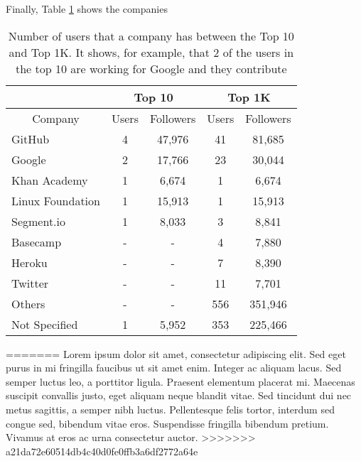 Finally, Table \ref{tbl:topcompanies} shows the companies 
\begin{table}
\centering
\begin{tabular}{ | l | c | c | c | c | }
	\hline
	\- & \multicolumn{2}{|c|}{Top 10} & \multicolumn{2}{|c|}{Top 1K} \\ \hline
	\multicolumn{1}{|c|}{Company} & Users & Followers & Users & Followers \\ \hline
	GitHub & 4 & 47,976 & 41 & 81,685 \\ \hline
	Google & 2 & 17,766 & 23 & 30,044 \\ \hline
	Khan Academy & 1 & 6,674 & 1 & 6,674 \\ \hline
	Linux Foundation & 1 & 15,913 & 1 & 15,913 \\ \hline
	Segment.io & 1 & 8,033 & 3 & 8,841 \\ \hline
	Basecamp & - & - & 4 & 7,880 \\ \hline
	Heroku & - & - & 7 & 8,390 \\ \hline
	Twitter & - & - & 11 & 7,701 \\ \hline
	Others & - & - & 556 & 351,946 \\ \hline
	Not Specified & 1 & 5,952 & 353 & 225,466 \\ \hline
\end{tabular}
\caption{Number of users that a company has between the Top 10 and Top 1K. It shows, for example, that 2 of the users in the top 10 are working for Google and they contribute }
\label{tbl:topcompanies}
\end{table}
=======
Lorem ipsum dolor sit amet, consectetur adipiscing elit. Sed eget purus in mi fringilla faucibus ut sit amet enim. Integer ac aliquam lacus. Sed semper luctus leo, a porttitor ligula. Praesent elementum placerat mi. Maecenas suscipit convallis justo, eget aliquam neque blandit vitae. Sed tincidunt dui nec metus sagittis, a semper nibh luctus. Pellentesque felis tortor, interdum sed congue sed, bibendum vitae eros. Suspendisse fringilla bibendum pretium. Vivamus at eros ac urna consectetur auctor.
>>>>>>> a21da72e60514db4c40d0fe0ffb3a6df2772a64e
